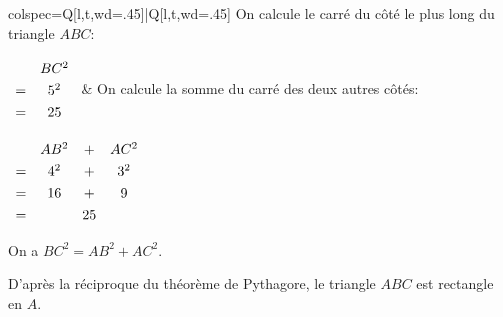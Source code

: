 \documentclass[../main.tex]{subfiles}
\begin{document}
        \begin{exemple}
            \begin{center}
            \end{center}
            \begin{tblr}{
                colspec={Q[l,t,wd=.45\linewidth]|Q[l,t,wd=.45\linewidth]}
            }
            On calcule le carré du côté le plus long du triangle $ABC$:%
            \par\vspace{15pt}
            $\begingroup\renewcommand{\arraystretch}{1.3}
            \begin{array}{cc}
                &BC^2\\
                =&5^2\\
                =&25
            \end{array}\endgroup
            $
            &
            On calcule la somme du carré des deux autres côtés:\par\vspace{15pt}
            $\begingroup\renewcommand{\arraystretch}{1.3}
            \begin{array}{cccc}
                &AB^2&+&AC^2\\
                =&4^2&+&3^2\\
                =&16&+&9\\
                =&&25&
            \end{array}\endgroup
            $
            \end{tblr}\par\vspace{10pt}
            On a $BC^2=AB^2+AC^2$.\par\vspace{10pt}
            D'après la réciproque du théorème de
            Pythagore, le triangle $ABC$ est rectangle en $A$.
        \end{exemple}
\end{document}
